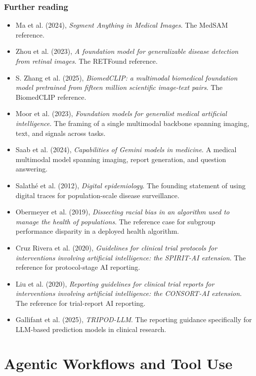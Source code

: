 \documentclass[
  letterpaper,
  11pt]{scrbook}
\providecommand{\tightlist}{%
  \setlength{\itemsep}{0pt}\setlength{\parskip}{0pt}}
\begin{document}
\section{Further reading}\label{further-reading-6}

\begin{itemize}
\tightlist
\item
  Ma et al. (2024), \emph{Segment Anything in Medical Images}. The
  MedSAM reference.
\item
  {Zhou et al.} (2023), \emph{A foundation model for generalizable
  disease detection from retinal images}. The RETFound reference.
\item
  S. Zhang et al. (2025), \emph{BiomedCLIP: a multimodal biomedical
  foundation model pretrained from fifteen million scientific image-text
  pairs}. The BiomedCLIP reference.
\item
  {Moor et al.} (2023), \emph{Foundation models for generalist medical
  artificial intelligence}. The framing of a single multimodal backbone
  spanning imaging, text, and signals across tasks.
\item
  {Saab et al.} (2024), \emph{Capabilities of Gemini models in
  medicine}. A medical multimodal model spanning imaging, report
  generation, and question answering.
\item
  {Salathé et al.} (2012), \emph{Digital epidemiology}. The founding
  statement of using digital traces for population-scale disease
  surveillance.
\item
  Obermeyer et al. (2019), \emph{Dissecting racial bias in an algorithm
  used to manage the health of populations}. The reference case for
  subgroup performance disparity in a deployed health algorithm.
\item
  Cruz Rivera et al. (2020), \emph{Guidelines for clinical trial
  protocols for interventions involving artificial intelligence: the
  SPIRIT-AI extension}. The reference for protocol-stage AI reporting.
\item
  Liu et al. (2020), \emph{Reporting guidelines for clinical trial
  reports for interventions involving artificial intelligence: the
  CONSORT-AI extension}. The reference for trial-report AI reporting.
\item
  {Gallifant et al.} (2025), \emph{TRIPOD-LLM}. The reporting guidance
  specifically for LLM-based prediction models in clinical research.
\end{itemize}

\part{Agentic Workflows and Tool Use}
\end{document}
